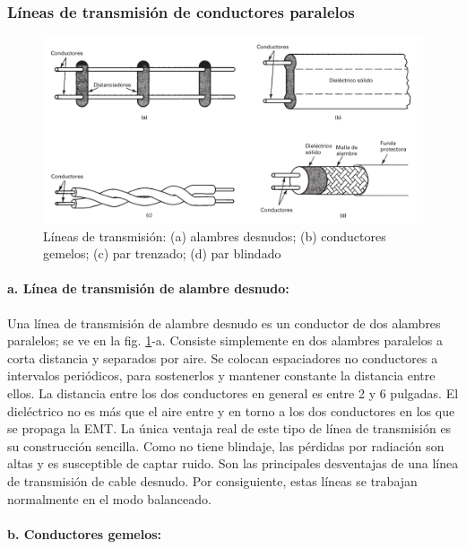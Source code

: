         \subsubsection{Líneas de transmisión de conductores paralelos}

            \begin{figure}[H]
                \centering
                \includegraphics[width=0.8\linewidth]{imagenes/tipos_lineas.png}
                \caption{Líneas de transmisión: (a) alambres desnudos; (b) conductores gemelos; (c) par trenzado; (d) par blindado}
                \label{fig:tipos_lineas}
            \end{figure}

            \paragraph{a. Línea de transmisión de alambre desnudo:}

            Una línea de transmisión de alambre desnudo es un conductor de dos alambres paralelos; se ve en la fig. \ref{fig:tipos_lineas}-a. Consiste simplemente en dos alambres paralelos a corta distancia y separados por aire. Se colocan espaciadores no conductores a intervalos periódicos, para sostenerlos y mantener constante la distancia entre ellos.
            La distancia entre los dos conductores en general es entre 2 y 6 pulgadas. El dieléctrico no es más que el aire entre y en torno a los dos conductores en los que se propaga la EMT. La única ventaja real de este tipo de línea de transmisión es su construcción sencilla. Como no tiene blindaje, las pérdidas por radiación son altas y es susceptible de captar ruido. Son las principales desventajas de una línea de transmisión de cable desnudo. Por consiguiente, estas líneas se trabajan normalmente en el modo balanceado.

            \paragraph{b. Conductores gemelos:}


